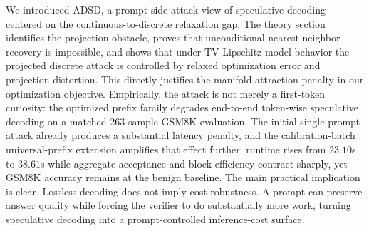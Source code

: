 \documentclass{article}
\begin{document}
We introduced ADSD, a prompt-side attack view of speculative decoding centered
on the continuous-to-discrete relaxation gap. The theory section identifies the
projection obstacle, proves that unconditional nearest-neighbor recovery is
impossible, and shows that under TV-Lipschitz model behavior the projected
discrete attack is controlled by relaxed optimization error and projection
distortion. This directly justifies the manifold-attraction penalty in our
optimization objective. Empirically, the attack is not merely a first-token
curiosity: the optimized prefix family degrades end-to-end token-wise
speculative decoding on a matched 263-sample GSM8K evaluation. The initial
single-prompt attack already produces a substantial latency penalty, and the
calibration-batch universal-prefix extension amplifies that effect further:
runtime rises from $23.10$s to $38.61$s while aggregate acceptance and block
efficiency contract sharply, yet GSM8K accuracy remains at the benign baseline.
The main practical implication is clear. Lossless decoding does not imply cost
robustness. A prompt can preserve answer quality while forcing the verifier to
do substantially more work, turning speculative decoding into a
prompt-controlled inference-cost surface.







\end{document}
